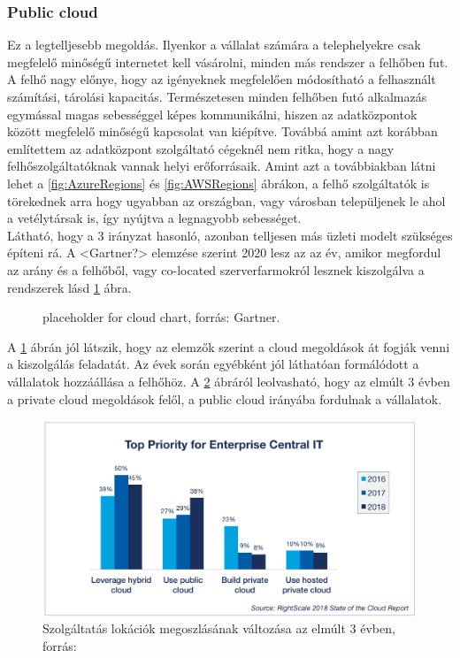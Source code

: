 \documentclass[12pt,oneside,justify,table]{book}
\begin{document}
\subsubsection{Public cloud}
Ez a legtelljesebb megoldás. Ilyenkor a vállalat számára a telephelyekre csak megfelelő minőségű internetet kell vásárolni, minden más rendszer a felhőben fut. A felhő nagy előnye, hogy az igényeknek megfelelően módosítható a felhasznált számítási, tárolási kapacitás. Természetesen minden felhőben futó alkalmazás egymással magas sebességgel képes kommunikálni, hiszen az adatközpontok között megfelelő minőségű kapcsolat van kiépítve. Továbbá amint azt korábban említettem az adatközpont szolgáltató cégeknél nem ritka, hogy a nagy felhőszolgáltatóknak vannak helyi erőforrásaik. Amint azt a továbbiakban látni lehet a \ref{fig:AzureRegions} és \ref{fig:AWSRegions} ábrákon, a felhő szolgáltatók is törekednek arra hogy ugyabban az országban, vagy városban települjenek le ahol a vetélytársak is, így nyújtva a legnagyobb sebességet. \\

Látható, hogy a 3 irányzat hasonló, azonban telljesen más üzleti modelt szükséges építeni rá. A <Gartner?> elemzése szerint 2020 lesz az az év, amikor megfordul az arány és a felhőből, vagy co-located szerverfarmokról lesznek kiszolgálva a rendszerek lásd \ref{fig:CloudVsOnPrem} ábra.   
\begin{figure}[H]
\centering
\caption{placeholder for cloud chart, forrás: Gartner.}
\label{fig:CloudVsOnPrem}
\end{figure}

A \ref{fig:CloudVsOnPrem} ábrán jól látszik, hogy az elemzők szerint a cloud megoldások át fogják venni a kiszolgálás feladatát. Az évek során egyébként jól láthatóan formálódott a vállalatok hozzáállása a felhőhöz. A \ref{fig:3yearCloudvsOnPrem} ábráról leolvasható, hogy az elmúlt 3 évben a private cloud megoldások felől, a public cloud irányába fordulnak a vállalatok.
\begin{figure}[H]
\centering
\includegraphics[width=1\textwidth]{4-Cloud-Computing-Trends-Enterprises-Prioritizing-Public-Cloud.png}
\caption{Szolgáltatás lokációk megoszlásának változása az elmúlt 3 évben, forrás: \cite{RightScale}}
\label{fig:3yearCloudvsOnPrem}
\end{figure}
\end{document}
